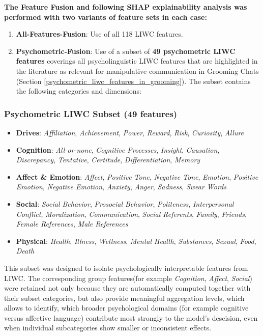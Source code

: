 

\textbf{The Feature Fusion and following SHAP explainability analysis was performed with two variants of feature sets in each case: }
\begin{enumerate}
    \item \textbf{All-Features-Fusion}: Use of all 118 LIWC features.
    \item \textbf{Psychometric-Fusion}: Use of a subset of \textbf{49 psychometric LIWC features} coverings all psycholinguistic LIWC features that are highlighted in the literature as relevant for manipulative communication in Grooming Chats (Section \ref{psychometric_liwc_features_in_grooming}). The subset contains the following categories and dimensions:
\end{enumerate}

\subsubsection{Psychometric LIWC Subset (49 features)}

\begin{itemize}
  \item \textbf{Drives}: \textit{Affiliation}, \textit{Achievement}, \textit{Power}, \textit{Reward}, \textit{Risk}, \textit{Curiosity}, \textit{Allure}
  \item \textbf{Cognition}: \textit{All-or-none}, \textit{Cognitive Processes}, \textit{Insight}, \textit{Causation}, \textit{Discrepancy}, \textit{Tentative}, \textit{Certitude}, \textit{Differentiation}, \textit{Memory}
  \item \textbf{Affect \& Emotion}: \textit{Affect}, \textit{Positive Tone}, \textit{Negative Tone}, \textit{Emotion}, \textit{Positive Emotion}, \textit{Negative Emotion}, \textit{Anxiety}, \textit{Anger}, \textit{Sadness}, \textit{Swear Words}
  \item \textbf{Social}: \textit{Social Behavior}, \textit{Prosocial Behavior}, \textit{Politeness}, \textit{Interpersonal Conflict}, \textit{Moralization}, \textit{Communication}, \textit{Social Referents}, \textit{Family}, \textit{Friends}, \textit{Female References}, \textit{Male References}
  \item \textbf{Physical}: \textit{Health}, \textit{Illness}, \textit{Wellness}, \textit{Mental Health}, \textit{Substances}, \textit{Sexual}, \textit{Food}, \textit{Death}
\end{itemize}


This subset was designed to isolate psychologically interpretable features from LIWC. The corresponding group features(for example \textit{Cognition}, \textit{Affect}, \textit{Social}) were retained not only because they are automatically computed together with their subset categories, but also provide meaningful aggregation levels, which allows to identify, which broader psychological domains (for example cognitive versus affective language) contribute most strongly to the model's descision, even when individual subcategories show smaller or inconsistent effects. 

